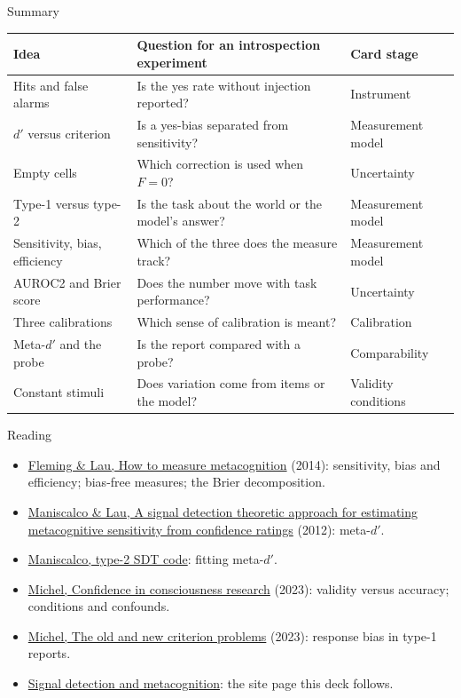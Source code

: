 \documentclass[aspectratio=169,11pt]{beamer}
\newcommand{\site}{https://measuring-introspection.github.io/measuring-introspection}
\begin{document}
\begin{frame}[label=summary]{Summary}
\begin{center}
{\footnotesize\renewcommand{\arraystretch}{1.02}
\begin{tabular}{L{3.6cm}L{6.2cm}L{2.8cm}}
\toprule
\textbf{Idea} & \textbf{Question for an introspection experiment} & \textbf{Card stage} \\
\midrule
Hits and false alarms & Is the yes rate without injection reported? & Instrument \\
$d'$ versus criterion & Is a yes-bias separated from sensitivity? & Measurement model \\
Empty cells & Which correction is used when $F = 0$? & Uncertainty \\
Type-1 versus type-2 & Is the task about the world or the model's answer? & Measurement model \\
Sensitivity, bias, efficiency & Which of the three does the measure track? & Measurement model \\
AUROC2 and Brier score & Does the number move with task performance? & Uncertainty \\
Three calibrations & Which sense of calibration is meant? & Calibration \\
Meta-$d'$ and the probe & Is the report compared with a probe? & Comparability \\
Constant stimuli & Does variation come from items or the model? & Validity conditions \\
\bottomrule
\end{tabular}
}
\end{center}
\end{frame}

\begin{frame}[label=reading]{Reading}
\small
\begin{itemize}
  \item \href{https://www.frontiersin.org/articles/10.3389/fnhum.2014.00443/pdf}{Fleming \& Lau, How to measure metacognition} (2014): sensitivity, bias and efficiency; bias-free measures; the Brier decomposition.
  \item \href{https://www.sciencedirect.com/science/article/abs/pii/S1053810011002303}{Maniscalco \& Lau, A signal detection theoretic approach for estimating metacognitive sensitivity from confidence ratings} (2012): meta-$d'$.
  \item \href{https://www.columbia.edu/~bsm2105/type2sdt/}{Maniscalco, type-2 SDT code}: fitting meta-$d'$.
  \item \href{https://philarchive.org/archive/MICCIC-3}{Michel, Confidence in consciousness research} (2023): validity versus accuracy; conditions and confounds.
  \item \href{https://philpapers.org/archive/MICTOA-2.pdf}{Michel, The old and new criterion problems} (2023): response bias in type-1 reports.
  \item \href{\site/foundations/signal-detection/}{Signal detection and metacognition}: the site page this deck follows.
\end{itemize}
\end{frame}
\end{document}
